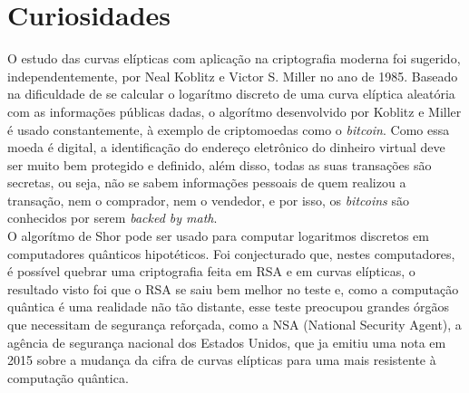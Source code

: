 \documentclass[14pt, oneside]{book}
\newcommand\tab[1][1cm]{\hspace*{#1}}
\theoremstyle{definition}
\begin{document}
            \section{Curiosidades}
                \tab O estudo das curvas elípticas com aplicação na criptografia moderna foi sugerido, independentemente, por Neal Koblitz e Victor S. Miller no ano de 1985. Baseado na dificuldade de se calcular o logarítmo discreto de uma curva elíptica aleatória com as informações públicas dadas, o algorítmo desenvolvido por Koblitz e Miller é usado constantemente, à exemplo de criptomoedas como o \textit{bitcoin}. Como essa moeda é digital, a identificação do endereço eletrônico do dinheiro virtual deve ser muito bem protegido e definido, além disso, todas as suas transações são secretas, ou seja, não se sabem informações pessoais de quem realizou a transação, nem o comprador, nem o vendedor, e por isso, os \textit{bitcoins} são conhecidos por serem \textit{backed by math}. \\
                \tab O algorítmo de Shor pode ser usado para computar logaritmos discretos em computadores quânticos hipotéticos. Foi conjecturado que, nestes computadores, é possível quebrar uma criptografia feita em RSA e em curvas elípticas, o resultado visto foi que o RSA se saiu bem melhor no teste e, como a computação quântica é uma realidade não tão distante, esse teste preocupou grandes órgãos que necessitam de segurança reforçada, como a NSA (National Security Agent), a agência de segurança nacional dos Estados Unidos, que ja emitiu uma nota em 2015 sobre a mudança da cifra de curvas elípticas para uma mais resistente à computação quântica.
                
\end{document}
